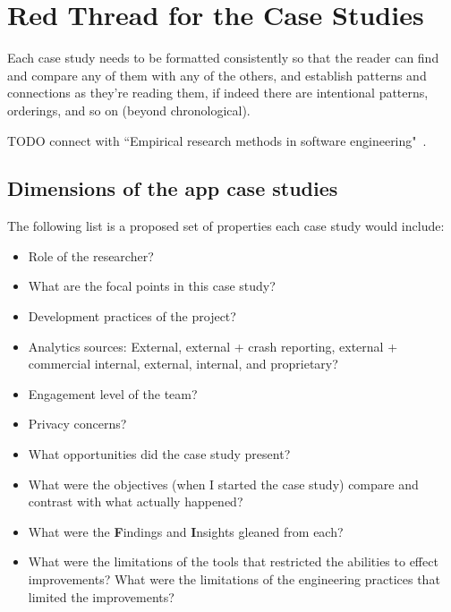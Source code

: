 \section{Red Thread for the Case Studies}
\label{section-case-studies-red-thread}

Each case study needs to be formatted consistently so that the reader can find and compare any of them with any of the others, and establish patterns and connections as they're reading them, if indeed there are intentional patterns, orderings, and so on (beyond chronological).


TODO connect with ``Empirical research methods in software engineering"~\citep{Wohlin2003_empirical_research_methods_in_software_engineering}.

\subsection{Dimensions of the app case studies}
The following list is a proposed set of properties each case study would include:
{\small
\begin{itemize}
    \itemsep0em
    \item Role of the researcher?
    \item What are the focal points in this case study?
    \item Development practices of the project?
    \item Analytics sources: External, external + crash reporting, external + commercial internal, external, internal, and proprietary?
    \item Engagement level of the team?
    \item Privacy concerns?
    \item What opportunities did the case study present?
    \item What were the objectives (when I started the case study) compare and contrast with what actually happened? 
    \item What were the \textbf{F}indings and \textbf{I}nsights gleaned from each?
    \item What were the limitations of the tools that restricted the abilities to effect improvements? What were the limitations of the engineering practices that limited the improvements?
\end{itemize}
}

